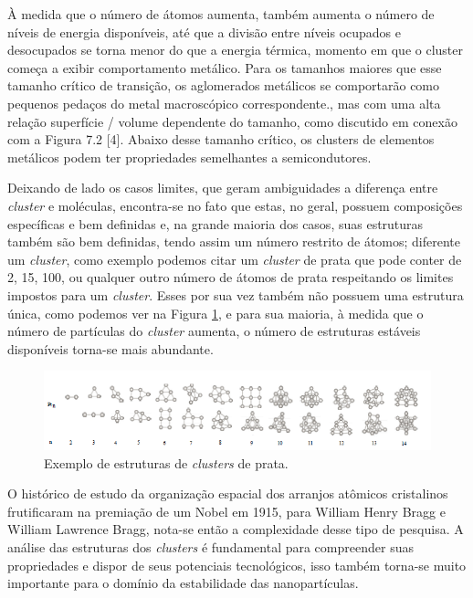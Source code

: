 À medida que o número de átomos aumenta, também aumenta o número de níveis de energia disponíveis, até que a divisão entre níveis ocupados e desocupados se torna menor do que a energia térmica, momento em que o cluster começa a exibir comportamento metálico. Para os tamanhos maiores que esse tamanho crítico de transição, os aglomerados metálicos se comportarão como pequenos pedaços do metal macroscópico correspondente., mas com uma alta relação superfície / volume dependente do tamanho, como discutido em conexão com a Figura 7.2 [4]. Abaixo desse tamanho crítico, os clusters de elementos metálicos podem ter propriedades semelhantes a semicondutores.


Deixando de lado os casos limites, que geram ambiguidades a diferença entre \textit{cluster} e moléculas, encontra-se no fato que estas, no geral, possuem composições específicas e bem definidas e, na grande maioria dos casos, suas estruturas também são bem definidas, tendo  assim um número restrito de átomos; diferente um \textit{cluster}, como exemplo podemos citar um \textit{cluster} de prata que pode conter de 2, 15, 100, ou qualquer outro número de átomos de prata respeitando os limites impostos para um \textit{cluster}. Esses por sua vez também não possuem uma estrutura única, como podemos ver na Figura \ref{fig:estrutura_cluster_ag}, e para sua maioria, à medida que o número de partículas do \textit{cluster} aumenta, o número de estruturas estáveis disponíveis torna-se mais abundante. 

\begin{figure}
  \centering
  \includegraphics[width=1\textwidth]{images/clusters/estrutura_cluster_ag}
  \caption{ Exemplo de estruturas de \textit{clusters} de prata.\cite{dissertacao_anderson}  }
  \label{fig:estrutura_cluster_ag}
\end{figure}






O histórico de estudo da organização espacial dos arranjos atômicos cristalinos frutificaram na premiação de um Nobel em 1915, para William Henry Bragg e William Lawrence Bragg, nota-se então a complexidade desse tipo de pesquisa. A análise das estruturas dos \textit{clusters} é fundamental para compreender suas propriedades e  dispor de seus potenciais tecnológicos, isso também torna-se muito importante para o domínio da estabilidade das nanopartículas. 



